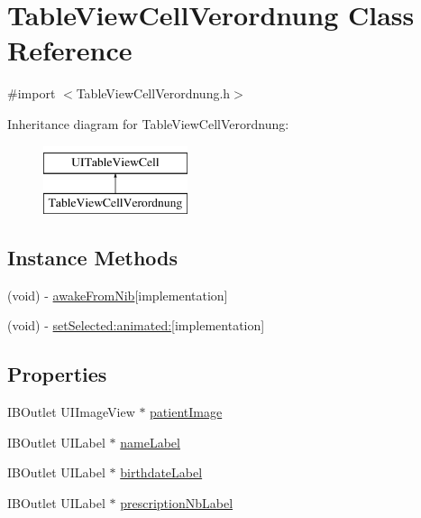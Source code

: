 \hypertarget{interface_table_view_cell_verordnung}{}\section{Table\+View\+Cell\+Verordnung Class Reference}
\label{interface_table_view_cell_verordnung}


{\ttfamily \#import $<$Table\+View\+Cell\+Verordnung.\+h$>$}

Inheritance diagram for Table\+View\+Cell\+Verordnung\+:\begin{figure}[H]
\begin{center}
\leavevmode
\includegraphics[height=2.000000cm]{interface_table_view_cell_verordnung}
\end{center}
\end{figure}
\subsection*{Instance Methods}
\begin{DoxyCompactItemize}
\item 
(void) -\/ \hyperlink{interface_table_view_cell_verordnung_ac08e10bf38dbb0fec2f4ba69d9b9adc2}{awake\+From\+Nib}{\ttfamily  \mbox{[}implementation\mbox{]}}
\item 
(void) -\/ \hyperlink{interface_table_view_cell_verordnung_ad16a41695876405482bd81febd53cb3f}{set\+Selected\+:animated\+:}{\ttfamily  \mbox{[}implementation\mbox{]}}
\end{DoxyCompactItemize}
\subsection*{Properties}
\begin{DoxyCompactItemize}
\item 
I\+B\+Outlet U\+I\+Image\+View $\ast$ \hyperlink{interface_table_view_cell_verordnung_a6bf7e26dbcb74e4871253168ee1f4641}{patient\+Image}
\item 
I\+B\+Outlet U\+I\+Label $\ast$ \hyperlink{interface_table_view_cell_verordnung_a388a628e07339449cba18d141583d903}{name\+Label}
\item 
I\+B\+Outlet U\+I\+Label $\ast$ \hyperlink{interface_table_view_cell_verordnung_a009099157047edee7cc4e28438a3ea1e}{birthdate\+Label}
\item 
I\+B\+Outlet U\+I\+Label $\ast$ \hyperlink{interface_table_view_cell_verordnung_a5d7141645571b699a717547caa83ff10}{prescription\+Nb\+Label}
\end{DoxyCompactItemize}


